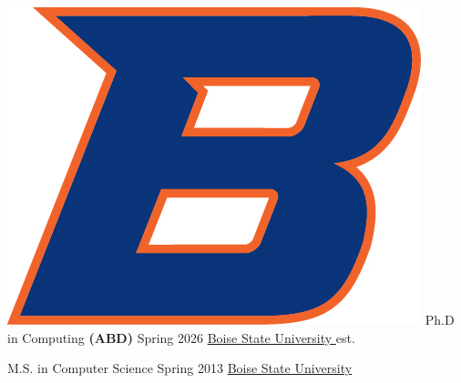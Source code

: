 \documentclass{shanep}
\begin{document}

\begin{itemize}

  \ressubheading
      {\includegraphics[scale=.3]{bsu.jpg}}
      {Ph.D in Computing \textbf{(ABD)}}
      {Spring 2026}
      {\href{http://www.boisestate.edu}{Boise State University }}
      {est.}
      {}

      \ressubheading
          {}
          {M.S. in Computer Science}
	  {Spring 2013}
	  {\href{http://www.boisestate.edu}{Boise State University }}
	  {}
	  {}

\end{itemize} %
\end{document}
